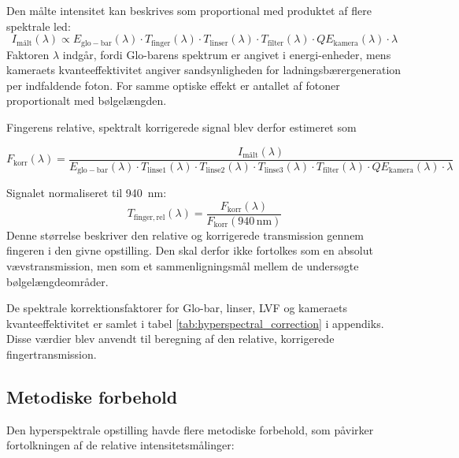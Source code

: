 Den målte intensitet kan beskrives som proportional med produktet af flere spektrale led:
\begin{equation}
    I_{\mathrm{målt}}(\lambda)
    \propto
    E_{\mathrm{glo-bar}}(\lambda)
    \cdot
    T_{\mathrm{finger}}(\lambda)
    \cdot
    T_{\mathrm{linser}}(\lambda)
    \cdot
    T_{\mathrm{filter}}(\lambda)
    \cdot
    QE_{\mathrm{kamera}}(\lambda)
    \cdot
    \lambda
\end{equation}
Faktoren $\lambda$ indgår, fordi Glo-barens spektrum er angivet i energi-enheder, mens kameraets kvanteeffektivitet angiver sandsynligheden for ladningsbærergeneration per indfaldende foton. For samme optiske effekt er antallet af fotoner proportionalt med bølgelængden.

Fingerens relative, spektralt korrigerede signal blev derfor estimeret som

\begin{equation}
    F_{\mathrm{korr}}(\lambda)
    =
    \frac{
    I_{\mathrm{målt}}(\lambda)
    }
    {
    E_{\mathrm{glo-bar}}(\lambda)
    \cdot
    T_{\mathrm{linse1}}(\lambda)
    \cdot
    T_{\mathrm{linse2}}(\lambda)
    \cdot
    T_{\mathrm{linse3}}(\lambda)
    \cdot
    T_{\mathrm{filter}}(\lambda)
    \cdot
    QE_{\mathrm{kamera}}(\lambda)
    \cdot
    \lambda
    }
\end{equation}

Signalet normaliseret til \SI{940}{nm}:
\begin{equation}
    T_{\mathrm{finger,rel}}(\lambda)
    =
    \frac{
    F_{\mathrm{korr}}(\lambda)
    }
    {
    F_{\mathrm{korr}}(940\,\mathrm{nm})
    }
\end{equation}
Denne størrelse beskriver den relative og korrigerede transmission gennem fingeren i den givne opstilling. Den skal derfor ikke fortolkes som en absolut vævstransmission, men som et sammenligningsmål mellem de undersøgte bølgelængdeområder.

De spektrale korrektionsfaktorer for Glo-bar, linser, LVF og kameraets kvanteeffektivitet er samlet i tabel \ref{tab:hyperspectral_correction} i appendiks. Disse værdier blev anvendt til beregning af den relative, korrigerede fingertransmission.

\subsection{Metodiske forbehold}
Den hyperspektrale opstilling havde flere metodiske forbehold, som påvirker fortolkningen af de relative intensitetsmålinger:

